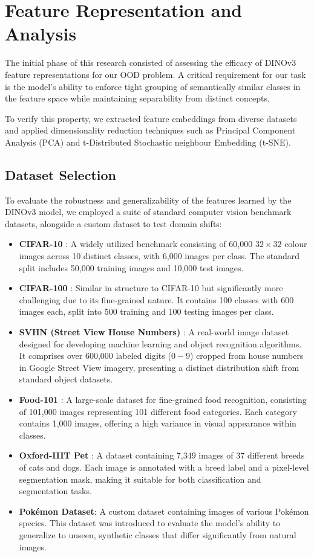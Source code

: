 \documentclass[oneside]{ctuthesis}
\begin{document}
\chapter{Feature Representation and Analysis}
\label{our_research}
The initial phase of this research consisted of assessing the efficacy of DINOv3 feature representations for our OOD problem. A critical requirement for our task is the model's ability to enforce tight grouping of semantically similar classes in the feature space while maintaining separability from distinct concepts.

To verify this property, we extracted feature embeddings from diverse datasets and applied dimensionality reduction techniques such as Principal Component Analysis (PCA) and t-Distributed Stochastic neighbour Embedding (t-SNE). 

\section{Dataset Selection}
\label{sec:dataset_selection}
To evaluate the robustness and generalizability of the features learned by the DINOv3 model, we employed a suite of standard computer vision benchmark datasets, alongside a custom dataset to test domain shifts:
\begin{itemize}
    \item \textbf{CIFAR-10} \cite{Krizhevsky2009LearningML}: A widely utilized benchmark consisting of 60,000 $32 \times 32$ colour images across 10 distinct classes, with 6,000 images per class. The standard split includes 50,000 training images and 10,000 test images.
    \item \textbf{CIFAR-100} \cite{Krizhevsky2009LearningML}: Similar in structure to CIFAR-10 but significantly more challenging due to its fine-grained nature. It contains 100 classes with 600 images each, split into 500 training and 100 testing images per class.
    \item \textbf{SVHN (Street View House Numbers)} \cite{Netzer2011ReadingDI}: A real-world image dataset designed for developing machine learning and object recognition algorithms. It comprises over 600,000 labeled digits ($0-9$) cropped from house numbers in Google Street View imagery, presenting a distinct distribution shift from standard object datasets.
    \item \textbf{Food-101} \cite{bossard2014food}: A large-scale dataset for fine-grained food recognition, consisting of 101,000 images representing 101 different food categories. Each category contains 1,000 images, offering a high variance in visual appearance within classes.
    \item \textbf{Oxford-IIIT Pet} \cite{6248092}: A dataset containing 7,349 images of 37 different breeds of cats and dogs. Each image is annotated with a breed label and a pixel-level segmentation mask, making it suitable for both classification and segmentation tasks.
    \item \textbf{Pokémon Dataset}: A custom dataset containing images of various Pokémon species. This dataset was introduced to evaluate the model's ability to generalize to unseen, synthetic classes that differ significantly from natural images.
\end{itemize}
\end{document}
